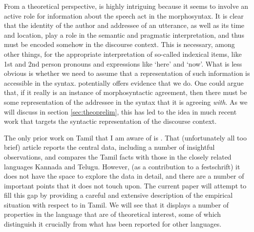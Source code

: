 \documentclass[output=paper, modfonts, nonflat]{langsci/langscibook}
\begin{document}
From a theoretical perspective, \allagr{} is highly intriguing because
it seems to involve an active role for information about the speech
act in the morphosyntax. It is clear that the identity of the author
and addressee of an utterance, as well as its time and location, play
a role in the semantic and pragmatic interpretation, and thus must be
encoded somehow in the discourse context. This is necessary, among
other things, for the appropriate interpretation of so-called
indexical items, like 1st and 2nd person pronouns and expressions like
`here' and `now'. What is less obvious is whether we need to assume
that a representation of such information is accessible in the
syntax. \allagr{} potentially offers evidence that we do. One could
argue that, if it really is an instance of morphosyntactic agreement,
then there must be some representation of the addressee in the syntax
that it is agreeing \emph{with}. As we will discuss in section
\ref{sec:theoprelim}, this has led to the idea in much recent work
that \allagr{} targets the syntactic representation of the discourse
context.


The only prior work on \allagr{} Tamil that I am aware of is
\citet{amrit:1991}. That (unfortunately all too brief) article reports
the central data, including a number of insightful observations, and
compares the Tamil facts with those in the closely related languages
Kannada and Telugu. However, (as a contribution to a festschrift) it
does not have the space to explore the data in detail, and there are a
number of important points that it does not touch upon. The current
paper will attempt to fill this gap by providing a careful and
extensive description of the empirical situation with respect to
\allagr{} in Tamil. We will see that it displays a number of
properties in the language that are of theoretical interest, some of
which distinguish it crucially from what has been reported for other
languages.
\end{document}
